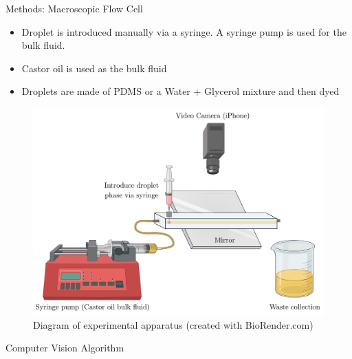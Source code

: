 \documentclass[final]{beamer}
\newlength{\colwidth}
\begin{document}
\begin{frame}[t]
\begin{columns}[t]
\begin{column}{\colwidth}
  \begin{block}{Methods: Macroscopic Flow Cell}
    \begin{itemize}
        \item Droplet is introduced manually via a syringe. A syringe pump is used for the bulk fluid.
        \item Castor oil is used as the bulk fluid
        \item Droplets are made of PDMS or a Water + Glycerol mixture and then dyed
    \end{itemize}
    
    \begin{figure}
      \centering
      \includegraphics[width=0.6\linewidth]{figures/Flow Cell.png}
      \caption{Diagram of experimental apparatus (created with BioRender.com)}
    \end{figure}

  \end{block}

  \begin{block}{Computer Vision Algorithm}


\end{block}
\end{column}
\end{columns}
\end{frame}
\end{document}
